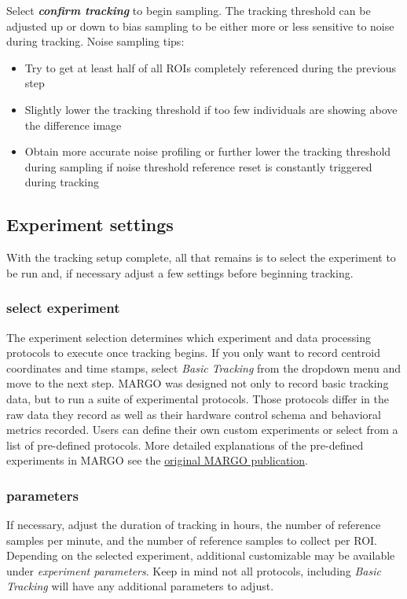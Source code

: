 \documentclass[11pt]{article}
\begin{document}
Select \textbf{\textit{confirm tracking}} to begin sampling. The tracking threshold can be adjusted up or down to bias sampling to be either more or less sensitive to noise during tracking. Noise sampling tips:

\begin{itemize}
	\itemsep0em
	\item Try to get at least half of all ROIs completely referenced during the previous step
	\item Slightly lower the tracking threshold if too few individuals are showing above the difference image
	\item Obtain more accurate noise profiling or further lower the tracking threshold during sampling if noise threshold reference reset is constantly triggered during tracking
\end{itemize}

\subsection{Experiment settings}

With the tracking setup complete, all that remains is to select the experiment to be run and, if necessary adjust a few settings before beginning tracking.

\subsubsection{select experiment}

The experiment selection determines which experiment and data processing protocols to execute once tracking begins. If you only want to record centroid coordinates and time stamps, select \textit{Basic Tracking} from the dropdown menu and move to the next step. MARGO was designed not only to record basic tracking data, but to run a suite of experimental protocols. Those protocols differ in the raw data they record as well as their hardware control schema and behavioral metrics recorded. Users can define their own \hypertarget{customexperiment}{custom experiments} or select from a list of pre-defined protocols. More detailed explanations of the pre-defined experiments in MARGO see the \href{https://www.google.com}{
original MARGO publication}.

\subsubsection{parameters}

If necessary, adjust the duration of tracking in hours, the number of reference samples per minute, and the number of reference samples to collect per ROI. Depending on the selected experiment, additional customizable may be available under \textit{experiment parameters}. Keep in mind not all protocols, including \textit{Basic Tracking} will have any additional parameters to adjust.
\end{document}
